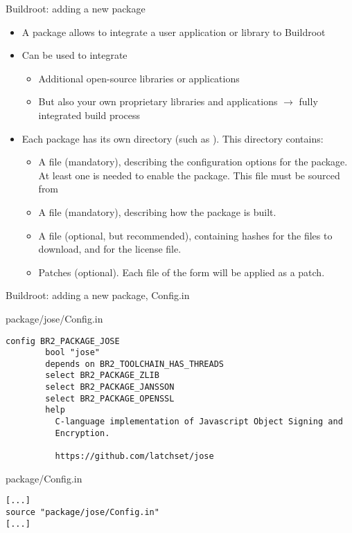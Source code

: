 \begin{frame}{Buildroot: adding a new package}
  \begin{itemize}
  \item A package allows to integrate a user application or library to
    Buildroot
  \item Can be used to integrate
    \begin{itemize}
    \item Additional open-source libraries or applications
    \item But also your own proprietary libraries and applications
      $\rightarrow$ fully integrated build process
    \end{itemize}
  \item Each package has its own directory (such as
    ). This directory contains:
    \begin{itemize}
    \item A  file (mandatory), describing the
      configuration options for the package. At least one is needed to
      enable the package. This file must be sourced from
    \item A  file (mandatory), describing how the
      package is built.
    \item A  file (optional, but recommended), containing
      hashes for the files to download, and for the license file.
    \item Patches (optional). Each file of the form
       will be applied as a patch.
    \end{itemize}
  \end{itemize}
\end{frame}

\begin{frame}[fragile]{Buildroot: adding a new package, Config.in}
  \begin{block}{package/jose/Config.in}
    {\scriptsize
\begin{verbatim}
config BR2_PACKAGE_JOSE
        bool "jose"
        depends on BR2_TOOLCHAIN_HAS_THREADS
        select BR2_PACKAGE_ZLIB
        select BR2_PACKAGE_JANSSON
        select BR2_PACKAGE_OPENSSL
        help
          C-language implementation of Javascript Object Signing and
          Encryption.

          https://github.com/latchset/jose
\end{verbatim}
      }
    \end{block}

    \begin{block}{package/Config.in}
    {\scriptsize
\begin{verbatim}
[...]
source "package/jose/Config.in"
[...]
\end{verbatim}
    }
    \end{block}
\end{frame}

